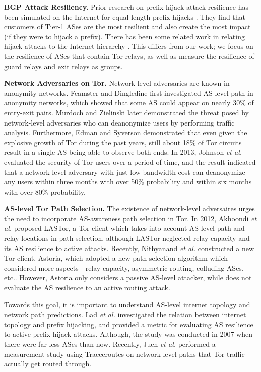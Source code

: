\documentclass{acm_proc_article-sp}
\begin{document}
{\bf BGP Attack Resiliency.}
Prior research on prefix hijack attack resilience has been simulated on the Internet for equal-length prefix hijacks \cite{lad2007understanding}.  They find that customers of Tier-1 ASes are the most resilient and also create the most impact (if they were to hijack a prefix).  There has been some related work in relating hijack attacks to the Internet hierarchy \cite{zhao2012relation, zhao2012analysis}.  This differs from our work; we focus on the resilience of ASes that contain Tor relays, as well as measure the resilience of guard relays and exit relays as groups.

{\bf Network Adversaries on Tor.}
Network-level adversaries are known in anonymity networks. Feamster and Dingledine \cite{feamster2004location} first investigated AS-level path in anonymity networks, which showed that some AS could appear on nearly 30\% of entry-exit pairs. Murdoch and Zielinski \cite{murdoch2007sampled} later demonstrated the threat posed by network-level adversaries who can deanonymize users by performing traffic analysis. Furthermore, Edman and Syverson \cite{edman2009awareness} demonstrated that even given the explosive growth of Tor during the past years, still about 18\% of Tor circuits result in a single AS being able to observe both ends. In 2013, Johnson \emph{et al.} \cite{johnson2013users} evaluated the security of Tor users over a period of time, and the result indicated that a network-level adversary with just low bandwidth cost can deanonymize any users within three months with over 50\% probability and within six months with over 80\% probability.

{\bf AS-level Tor Path Selection.}
The existence of network-level adversaires urges the need to incorporate AS-awareness path selection in Tor. In 2012, Akhoondi \emph{et al.} \cite{akhoondi2012lastor} proposed LASTor, a Tor client which takes into account AS-level path and relay locations in path selection, although LASTor neglected relay capacity and its AS resilience to active attacks. Recently, Nithyanand \emph{et al.} \cite{starov2015measuring} constructed a new Tor client, Astoria, which adopted a new path selection algorithm which considered more aspects - relay capacity, asymmetric routing, colluding ASes, etc.. However, Astoria only considers a passive AS-level attacker, while does not evaluate the AS resilience to an active routing attack.

Towards this goal, it is important to understand AS-level internet topology and network path predictions. Lad \emph{et al.} \cite{lad2007understanding} investigated the relation between internet topology and prefix hijacking, and provided a metric for evaluating AS resilience to active prefix hijack attacks. Although, the study was conducted in 2007 when there were far less ASes than now. Recently, Juen \emph{et al.} \cite{juen2014defending} performed a measurement study using Tracecroutes on network-level paths that Tor traffic actually get routed through. 


{\footnotesize 
}

\end{document}
